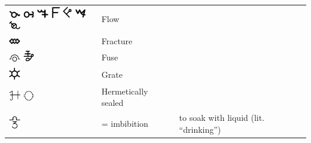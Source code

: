 \documentclass[british,final,landscape]{scrartcl}
\begin{document}
\begin{refsection}
\begin{supertabular}{p{0.3\textwidth}p{0.34\textwidth}p{0.34\textwidth}}
   \includegraphics[width=5mm]{Process/Flow} \includegraphics[width=5mm]{Process/Flow2} \includegraphics[width=5mm]{Process/Flow3} \includegraphics[height=5mm]{Process/Flow4} \includegraphics[height=5mm]{Process/Flow5} \includegraphics[width=5mm]{Process/Flow6} \includegraphics[width=5mm]{Process/Flow7} & Flow & \\
   \includegraphics[width=5mm]{Process/Fracture} & Fracture & \\
   \includegraphics[width=5mm]{Process/Fuse} \includegraphics[width=5mm]{Process/Fuse2} & Fuse & \\
   \includegraphics[width=5mm]{Process/Grate} & Grate & \\
   \includegraphics[width=5mm]{Process/HermeticallySealed} \includegraphics[width=5mm]{Process/HermeticallySealed2} & Hermetically sealed & \\
   \includegraphics[width=5mm]{Process/Imbibitio} &  = imbibition & to soak with liquid (lit. ``drinking'') \\

\end{supertabular}
\end{refsection}
\end{document}
